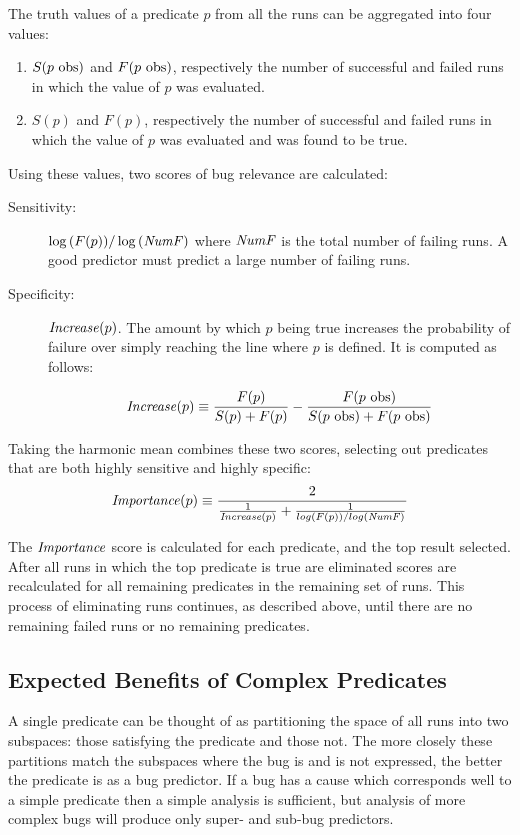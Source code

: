 The truth values of a predicate $p$ from all the runs can be aggregated into four values:

\begin{enumerate}
\item $S(\text{$p$ obs})$ and $F(\text{$p$ obs})$, respectively the number of successful and failed runs in which the value of $p$ was evaluated.
\item $S(p)$ and $F(p)$, respectively the number of successful and failed runs in which the value of $p$ was evaluated and was found to be true.
\end{enumerate}

Using these values, two scores of bug relevance are calculated:
\begin{description}
\item[Sensitivity:] $\log{(F(p))} / \log{(\mathit{NumF})}$ where $\mathit{NumF}$ is the total number of failing runs.  A good predictor must predict a large number of failing runs.
\item[Specificity:] $\mathit{Increase}(p)$.  The amount by which $p$ being true increases the probability of failure over simply reaching the line where $p$ is defined.  It is computed as follows:

  \begin{equation}
    \label{eqn1}
    \mathit{Increase}(p) \equiv
    \frac{F(p)}{S(p) + F(p)}
    -
    \frac{F(\text{$p$ obs})}{S(\text{$p$ obs}) + F(\text{$p$ obs})}
  \end{equation}

\end{description}

Taking the harmonic mean combines these two scores, selecting out predicates that are both highly sensitive and highly specific:
\begin{equation}
\label{eqn2}
\Importance(p) \equiv
\frac{2}{%
  \frac{1}{\Increase(p)}
  +
  \frac{1}{log(F(p)) / log(\NumF)}}
\end{equation}

The $\mathit{Importance}$ score is calculated for each predicate, and the top result selected.  After all runs in which the top predicate is true are eliminated scores are recalculated for all remaining predicates in the remaining set of runs.  This process of eliminating runs continues, as described above, until there are no remaining failed runs or no remaining predicates.

\subsection{Expected Benefits of Complex Predicates}
A single predicate can be thought of as partitioning the space of all runs into two subspaces: those satisfying the predicate and those not.  The more closely these partitions match the subspaces where the bug is and is not expressed, the better the predicate is as a bug predictor.  If a bug has a cause which corresponds well to a simple predicate then a simple analysis is sufficient, but analysis of more complex bugs will produce only super- and sub-bug predictors.

